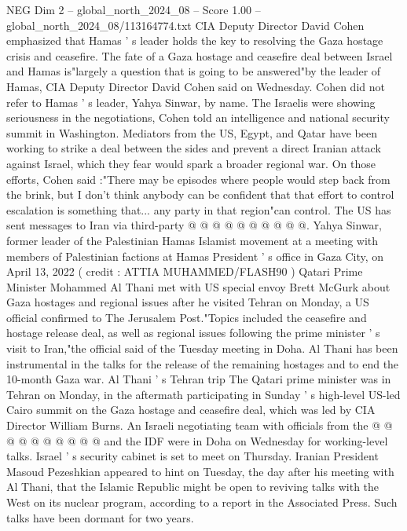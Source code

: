 \begin{textsample}{NEG Dim 2 – global\_north\_2024\_08 – Score 1.00 – global\_north\_2024\_08/113164774.txt}  \label{ex:f2_neg_057}
CIA Deputy Director David Cohen emphasized that Hamas ' s leader holds the key to resolving the Gaza hostage crisis and ceasefire.
The fate of a Gaza hostage and ceasefire deal between Israel and Hamas is"largely a question that is going to be answered"by the leader of Hamas, CIA Deputy Director David Cohen said on Wednesday.
Cohen did not refer to Hamas ' s leader, Yahya Sinwar, by name.
The Israelis were showing seriousness in the negotiations, Cohen told an intelligence and national security summit in Washington.
Mediators from the US, Egypt, and Qatar have been working to strike a deal between the sides and prevent a direct Iranian attack against Israel, which they fear would spark a broader regional war.
On those efforts, Cohen said :"There may be episodes where people would step back from the brink, but I don't think anybody can be confident that that effort to control escalation is something that... any party in that region"can control.
The US has sent messages to Iran via third-party @ @ @ @ @ @ @ @ @ @.
Yahya Sinwar, former leader of the Palestinian Hamas Islamist movement at a meeting with members of Palestinian factions at Hamas President ' s office in Gaza City, on April 13, 2022 ( credit : ATTIA MUHAMMED/FLASH90 ) Qatari Prime Minister Mohammed Al Thani met with US special envoy Brett McGurk about Gaza hostages and regional issues after he visited Tehran on Monday, a US official confirmed to The Jerusalem Post."Topics included the ceasefire and hostage release deal, as well as regional issues following the prime minister ' s visit to Iran,"the official said of the Tuesday meeting in Doha.
Al Thani has been instrumental in the talks for the release of the remaining hostages and to end the 10-month Gaza war.
Al Thani ' s Tehran trip The Qatari prime minister was in Tehran on Monday, in the aftermath participating in Sunday ' s high-level US-led Cairo summit on the Gaza hostage and ceasefire deal, which was led by CIA Director William Burns.
An Israeli negotiating team with officials from the @ @ @ @ @ @ @ @ @ @ and the IDF were in Doha on Wednesday for working-level talks.
Israel ' s security cabinet is set to meet on Thursday.
Iranian President Masoud Pezeshkian appeared to hint on Tuesday, the day after his meeting with Al Thani, that the Islamic Republic might be open to reviving talks with the West on its nuclear program, according to a report in the Associated Press.
Such talks have been dormant for two years.

\end{textsample}
